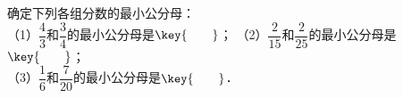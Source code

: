 确定下列各组分数的最小公分母：\\
（1）$\dfrac {4}{3}$和$\dfrac {3}{4}$的最小公分母是$\key{\qquad}$；\qquad\qquad
（2）$\dfrac {2}{15}$和$\dfrac {2}{25}$的最小公分母是$\key{\qquad}$；\\
（3）$\dfrac {1}{6}$和$\dfrac {7}{20}$的最小公分母是$\key{\qquad}$．